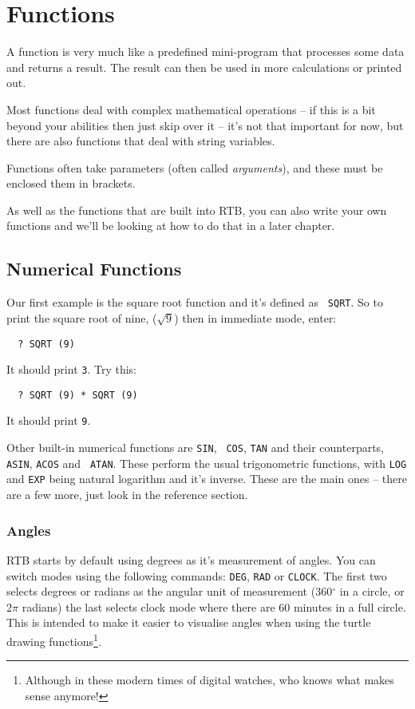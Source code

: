 \chapter{Functions}
A function is very much like a predefined mini-program that processes
some data and returns a result. The result can then be used in more
calculations or printed out.

Most functions deal with complex mathematical operations -- if this is
a bit beyond your abilities then just skip over it -- it's not that
important for now, but there are also functions that deal with string
variables.

Functions often take parameters (often called {\em arguments}), and
these must be enclosed them in brackets. 

As well as the functions that are built into RTB, you can also write your
own functions and we'll be looking at how to do that in a later chapter.

\section{Numerical Functions}
Our first example is the square root function and it's defined as {\tt
SQRT}. So to print the square root of nine, ($\sqrt{9}$)
then in immediate mode, enter:

\begin{verbatim}
  ? SQRT (9)
\end{verbatim}
It should print {\tt 3}.  Try this:
\begin{verbatim}
  ? SQRT (9) * SQRT (9)
\end{verbatim}
It should print {\tt 9}. 

Other built-in numerical functions are {\tt SIN}, {\tt
COS}, {\tt TAN} and their counterparts,
{\tt ASIN}, {\tt ACOS} and {\tt
ATAN}. These perform the usual trigonometric functions, with
{\tt LOG} and {\tt EXP} being natural logarithm
and it's inverse. These are the main ones -- there are a few more,
just look in the reference section.

\subsection{Angles}
RTB starts by default using degrees as it's measurement of angles. You can
switch modes using the following commands: {\tt DEG},
{\tt RAD} or {\tt CLOCK}. The
first two selects degrees or radians as
the angular unit of measurement (360$^{\circ}$ in a circle, or 2$\pi$
radians) the last selects clock mode where there are 60
minutes in a full circle. This is intended to make it easier to visualise
angles when using the turtle drawing functions\footnote{Although in these
modern times of digital watches, who knows what
makes sense anymore!}.

